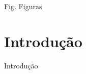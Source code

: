\documentclass[12pt,oneside,a4paper,english,french,spanish]{univille-brasil-abntex2}
\begin{document}
\listoffigures*
\cleardoublepage

\listoftables*
\cleardoublepage

\begin{siglas}
    \item[Fig.] Figuras
\end{siglas}


\tableofcontents*
\cleardoublepage

\mainmatter

\chapter*[Introdução]{Introdução}
	
	\thispagestyle{empty}
		
	Introdução



\end{document}
